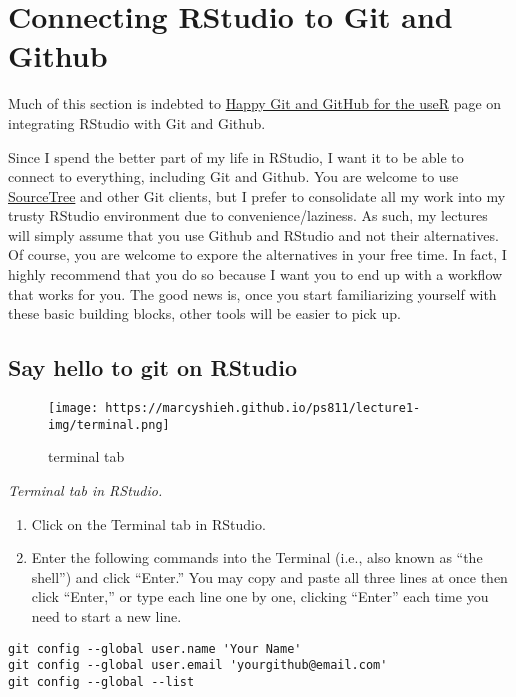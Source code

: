 \documentclass[
]{book}
\begin{document}
\hypertarget{RStudio-Github}{%
\section{Connecting RStudio to Git and Github}\label{RStudio-Github}}

Much of this section is indebted to \href{https://happygitwithr.com/rstudio-git-github.html}{Happy Git and GitHub for the useR} page on integrating RStudio with Git and Github.

Since I spend the better part of my life in RStudio, I want it to be able to connect to everything, including Git and Github. You are welcome to use \href{https://www.sourcetreeapp.com/}{SourceTree} and other Git clients, but I prefer to consolidate all my work into my trusty RStudio environment due to convenience/laziness. As such, my lectures will simply assume that you use Github and RStudio and not their alternatives. Of course, you are welcome to expore the alternatives in your free time. In fact, I highly recommend that you do so because I want you to end up with a workflow that works for you. The good news is, once you start familiarizing yourself with these basic building blocks, other tools will be easier to pick up.

\hypertarget{say-hello-to-git-on-rstudio}{%
\subsection{Say hello to git on RStudio}\label{say-hello-to-git-on-rstudio}}

\begin{figure}
\centering
\texttt{[image: https://marcyshieh.github.io/ps811/lecture1-img/terminal.png]}
\caption{terminal tab}
\end{figure}

\emph{Terminal tab in RStudio.}

\begin{enumerate}
\def\labelenumi{\arabic{enumi}.}
\item
  Click on the Terminal tab in RStudio.
\item
  Enter the following commands into the Terminal (i.e., also known as ``the shell'') and click ``Enter.'' You may copy and paste all three lines at once then click ``Enter,'' or type each line one by one, clicking ``Enter'' each time you need to start a new line.
\end{enumerate}

\begin{verbatim}
git config --global user.name 'Your Name'
git config --global user.email 'yourgithub@email.com'
git config --global --list
\end{verbatim}
\end{document}
